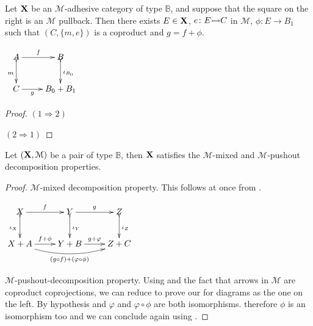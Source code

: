 \documentclass[a4paper,UKenglish,cleveref,pdftex,thm-restate,numberwithinsect,anonymous]{lipics}
\newcommand{\mto}[0]{\scalebox{1}{$\rightarrowtail$}}
\def\X{\textbf {\textup{X}}}
\begin{document}
\noindent
\parbox{10.7cm}{\begin{corollary}\label{cor:po2}
Let $\X$ be an $\mathcal{M}$-adhesive category of type $\mathbb{B}$, and suppose that the square on the right is an $\mathcal{M}$ pullback. Then there exists $E\in \X$, $e\colon E\mto C$ in $\mathcal{M}$, $\phi:E\to B_1$ such that $(C, \{m, e\})$ is a coproduct and $g=f+\phi$. 
\end{corollary}} \parbox{3cm}{\vspace{-.5cm}$\xymatrix{A  \ar[r]^{f} \ar@{>->}[d]_{m}& B \ar@{>->}[d]^{\iota_{B_{0}}}\\ C\ar[r]_-{g} & B_0+B_1}$}

\noindent 
\parbox{9.5cm}{\begin{proof}	$(1\Rightarrow 2)$ 
	
	\smallskip \noindent $(2\Rightarrow 1)$
\end{proof}}

\fi 

\begin{lemma}\label{lem:prop} Let $(\X, \mathcal{M})$ be a pair of type $\mathbb{B}$, then $\X$ satisfies the $\mathcal{M}$-mixed and $\mathcal{M}$-pushout decomposition properties.
\end{lemma}
\begin{proof}$\mathcal{M}$-mixed decomposition property. This follows at once from .
	
	\smallskip \noindent
	\parbox{3cm}{$\xymatrix{X \ar[r]^f \ar@{>->}[d]_{\iota_X}& Y\ar[r]^g \ar@{>->}[d]^{\iota_Y} & Z\ar@{>->}[d]^{\iota_Z}\\X+A  \ar@/_.4cm/[rr]_{(g\circ f) + (\varphi \circ \phi)}\ar[r]^{f+\phi}& Y+B \ar[r]^{g+\varphi}& Z+C}$} \qquad \qquad  \qquad   \qquad \parbox{8cm}{ $\mathcal{M}$-pushout-decomposition property. Using  and the fact that arrows in $\mathcal{M}$ are coproduct coprojections, we can reduce to prove our for diagrams as the one on the left. By hypothesis and  $\varphi$ and $\varphi\circ \phi$ are both isomorphisms. therefore $\phi$ is an isomorphism too and we can conclude again using .\qedhere 
}
	
		
\end{proof}
\end{document}
